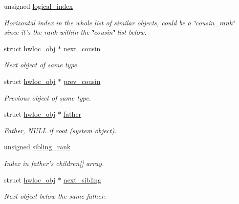 \begin{DoxyCompactItemize}
unsigned \hyperlink{structhwloc__obj_a0d07fb7b8935e137c94d75a3eb492ae9}{logical\_\-index}
\begin{DoxyCompactList}\small\item\em Horizontal index in the whole list of similar objects, could be a \char`\"{}cousin\_\-rank\char`\"{} since it's the rank within the \char`\"{}cousin\char`\"{} list below. \item\end{DoxyCompactList}\item 
struct \hyperlink{structhwloc__obj}{hwloc\_\-obj} $\ast$ \hyperlink{structhwloc__obj_a85a788017457129589318b6c39451acf}{next\_\-cousin}
\begin{DoxyCompactList}\small\item\em Next object of same type. \item\end{DoxyCompactList}\item 
struct \hyperlink{structhwloc__obj}{hwloc\_\-obj} $\ast$ \hyperlink{structhwloc__obj_ac715989f55ff5a0eb6be2969ee477ec0}{prev\_\-cousin}
\begin{DoxyCompactList}\small\item\em Previous object of same type. \item\end{DoxyCompactList}\item 
struct \hyperlink{structhwloc__obj}{hwloc\_\-obj} $\ast$ \hyperlink{structhwloc__obj_a5fb4d37969f7e132cbd8040df2139dc8}{father}
\begin{DoxyCompactList}\small\item\em Father, {\ttfamily NULL} if root (system object). \item\end{DoxyCompactList}\item 
unsigned \hyperlink{structhwloc__obj_aaa6043eee6f55869933c1d974efd9acd}{sibling\_\-rank}
\begin{DoxyCompactList}\small\item\em Index in father's {\ttfamily children}\mbox{[}\mbox{]} array. \item\end{DoxyCompactList}\item 
struct \hyperlink{structhwloc__obj}{hwloc\_\-obj} $\ast$ \hyperlink{structhwloc__obj_a7f2343ed476fe4942e6fffd4cade1b40}{next\_\-sibling}
\begin{DoxyCompactList}\small\item\em Next object below the same father. \item\end{DoxyCompactList}\item 

\end{DoxyCompactItemize}
